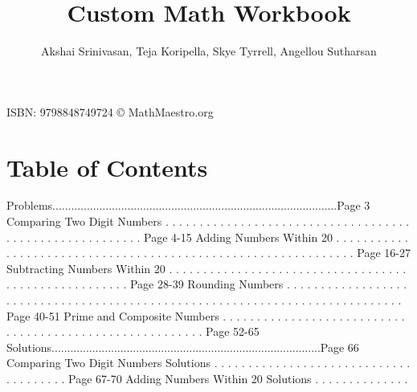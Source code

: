 \documentclass{article}%
\title{Custom Math Workbook}%
\author{Akshai Srinivasan, Teja Koripella, Skye Tyrrell, Angellou Sutharsan}%
\date{}%
\begin{document}
%
\normalsize%
\maketitle%
\vfill%
\begin{center}%
ISBN: 9798848749724%
\linebreak%
\copyright%
MathMaestro.org%
\end{center}%
\newpage%
\section{Table of Contents}%
\label{sec:TableofContents}%
Problems...........................................................................................Page 3%
\newline%
Comparing Two Digit Numbers%
.%
.%
.%
.%
.%
.%
.%
.%
.%
.%
.%
.%
.%
.%
.%
.%
.%
.%
.%
.%
.%
.%
.%
.%
.%
.%
.%
.%
.%
.%
.%
.%
.%
.%
.%
.%
.%
.%
.%
.%
.%
.%
.%
.%
.%
.%
.%
.%
.%
.%
.%
.%
.%
.%
.%
.%
Page 4{-}15%
\newline%
Adding Numbers Within 20%
.%
.%
.%
.%
.%
.%
.%
.%
.%
.%
.%
.%
.%
.%
.%
.%
.%
.%
.%
.%
.%
.%
.%
.%
.%
.%
.%
.%
.%
.%
.%
.%
.%
.%
.%
.%
.%
.%
.%
.%
.%
.%
.%
.%
.%
.%
.%
.%
.%
.%
.%
.%
.%
.%
.%
.%
.%
.%
.%
.%
.%
.%
Page 16{-}27%
\newline%
Subtracting Numbers Within 20%
.%
.%
.%
.%
.%
.%
.%
.%
.%
.%
.%
.%
.%
.%
.%
.%
.%
.%
.%
.%
.%
.%
.%
.%
.%
.%
.%
.%
.%
.%
.%
.%
.%
.%
.%
.%
.%
.%
.%
.%
.%
.%
.%
.%
.%
.%
.%
.%
.%
.%
.%
.%
.%
Page 28{-}39%
\newline%
Rounding Numbers%
.%
.%
.%
.%
.%
.%
.%
.%
.%
.%
.%
.%
.%
.%
.%
.%
.%
.%
.%
.%
.%
.%
.%
.%
.%
.%
.%
.%
.%
.%
.%
.%
.%
.%
.%
.%
.%
.%
.%
.%
.%
.%
.%
.%
.%
.%
.%
.%
.%
.%
.%
.%
.%
.%
.%
.%
.%
.%
.%
.%
.%
.%
.%
.%
.%
.%
.%
.%
.%
.%
.%
.%
.%
.%
.%
.%
Page 40{-}51%
\newline%
Prime and Composite Numbers%
.%
.%
.%
.%
.%
.%
.%
.%
.%
.%
.%
.%
.%
.%
.%
.%
.%
.%
.%
.%
.%
.%
.%
.%
.%
.%
.%
.%
.%
.%
.%
.%
.%
.%
.%
.%
.%
.%
.%
.%
.%
.%
.%
.%
.%
.%
.%
.%
.%
.%
.%
.%
.%
.%
.%
.%
Page 52{-}65%
\newline%
Solutions......................................................................................Page 66%
\newline%
Comparing Two Digit Numbers Solutions%
.%
.%
.%
.%
.%
.%
.%
.%
.%
.%
.%
.%
.%
.%
.%
.%
.%
.%
.%
.%
.%
.%
.%
.%
.%
.%
.%
.%
.%
.%
.%
.%
.%
.%
.%
.%
.%
.%
Page 67{-}70%
\newline%
Adding Numbers Within 20 Solutions%
.%
.%
.%
.%
.%
.%
.%
.%
.%
.%
.%
.%
.%
.%
\end{document}
